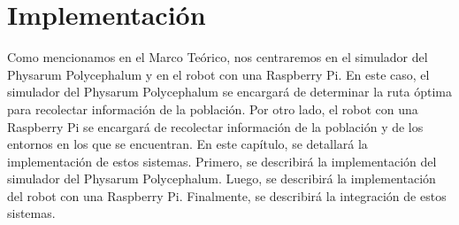 \section{Implementaci\'on}
\label{sec:Implementacion}
        Como mencionamos en el Marco Te\'orico, nos centraremos en el simulador del 
            Physarum Polycephalum y en el robot con una Raspberry Pi. En este caso,
            el simulador del Physarum Polycephalum se encargar\'a de determinar la ruta
            \'optima para recolectar informaci\'on de la poblaci\'on. Por otro lado, el
            robot con una Raspberry Pi se encargar\'a de recolectar informaci\'on de la
            poblaci\'on y de los entornos en los que se encuentran.
        \vskip 0.5cm
        En este cap\'itulo, se detallar\'a la implementaci\'on de estos sistemas. 
            Primero, se describir\'a la implementaci\'on del simulador del Physarum Polycephalum.
            Luego, se describir\'a la implementaci\'on del robot con una Raspberry Pi.
            Finalmente, se describir\'a la integraci\'on de estos sistemas.
        \vskip 0.5cm
    
    